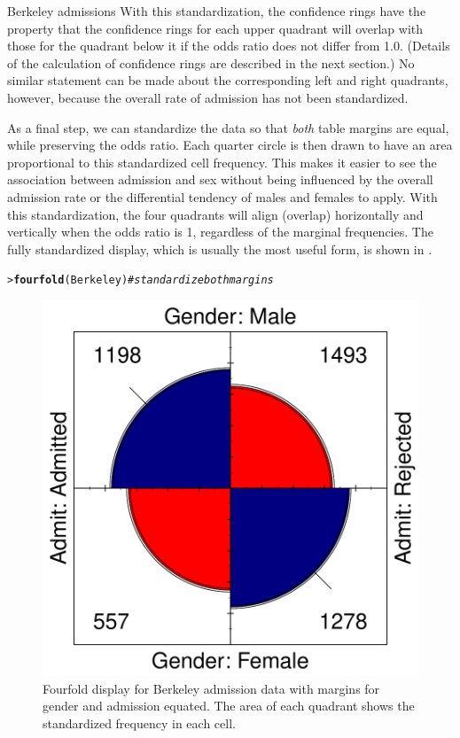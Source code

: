 \documentclass[10pt,krantz2]{krantz}\usepackage[]{graphicx}\usepackage[]{color}
\makeatletter
\newcommand{\hlcom}[1]{\textcolor[rgb]{0.678,0.584,0.686}{\textit{#1}}}%
\newcommand{\hlstd}[1]{\textcolor[rgb]{0.345,0.345,0.345}{#1}}%
\newcommand{\hlkwd}[1]{\textcolor[rgb]{0.737,0.353,0.396}{\textbf{#1}}}%
\newenvironment{kframe}{%
 \def\at@end@of@kframe{}%
 \ifinner\ifhmode%
  \def\at@end@of@kframe{\end{minipage}}%
  \begin{minipage}{\columnwidth}%
 \fi\fi%
 \def\FrameCommand##1{\hskip\@totalleftmargin \hskip-\fboxsep
 \colorbox{shadecolor}{##1}\hskip-\fboxsep
     \hskip-\linewidth \hskip-\@totalleftmargin \hskip\columnwidth}%
 \MakeFramed {\advance\hsize-\width
   \@totalleftmargin\z@ \linewidth\hsize
   \@setminipage}}%
 {\par\unskip\endMakeFramed%
 \at@end@of@kframe}
\newenvironment{knitrout}{}{} %
\renewenvironment{knitrout}{\small\renewcommand{\baselinestretch}{.85}}{} %
\makeatother
\begin{document}
\begin{Example}[berkeley2]{Berkeley admissions}
With this standardization, the confidence rings have the property
that the confidence rings for each upper quadrant will overlap
with those for the quadrant below it if the
odds ratio does not differ from 1.0.
(Details of the calculation of confidence rings are described
in the next section.)
No similar statement can be made about the
corresponding left and right quadrants, however, because
the overall rate of admission has not been standardized.

As a final step, we can standardize the data so that \emph{both} table margins
are equal, while preserving the odds ratio.
Each quarter circle is then drawn to have an area
proportional to this standardized cell frequency.  This makes it
easier to see the association between admission and sex without being
influenced by the overall admission rate or the differential tendency
of males and females to apply.  With this standardization, the four
quadrants will align (overlap) horizontally and vertically
when the odds ratio is 1, regardless of the
marginal frequencies.  The fully standardized display, which is
usually the most useful form, is shown in .

\begin{knitrout}
\color{fgcolor}\begin{kframe}
\begin{alltt}
\hlstd{> }\hlkwd{fourfold}\hlstd{(Berkeley)}  \hlcom{# standardize both margins}
\end{alltt}
\end{kframe}\begin{figure}[!htbp]

\centerline{\includegraphics[width=.6\textwidth]{ch04/fig/berk-fourfold3-1} }

\caption[Fourfold display for Berkeley admission data with margins for gender and admission equated]{Fourfold display for Berkeley admission data with margins for gender and admission equated. The area of each quadrant shows the standardized frequency in each cell.\label{fig:berk-fourfold3}}
\end{figure}


\end{knitrout}

\end{Example}
\end{document}
